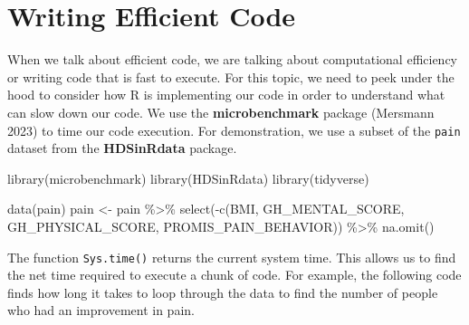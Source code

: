 \documentclass[
  letterpaper,
]{latex/krantz}
\makeatletter
\newenvironment{Shaded}{\begin{snugshade}}{\end{snugshade}}
\newcommand{\CommentTok}[1]{\textcolor[rgb]{0.37,0.37,0.37}{#1}}
\newcommand{\ControlFlowTok}[1]{\textcolor[rgb]{0.00,0.23,0.31}{#1}}
\newcommand{\DecValTok}[1]{\textcolor[rgb]{0.68,0.00,0.00}{#1}}
\newcommand{\FunctionTok}[1]{\textcolor[rgb]{0.28,0.35,0.67}{#1}}
\newcommand{\NormalTok}[1]{\textcolor[rgb]{0.00,0.23,0.31}{#1}}
\newcommand{\OtherTok}[1]{\textcolor[rgb]{0.00,0.23,0.31}{#1}}
\newcommand{\SpecialCharTok}[1]{\textcolor[rgb]{0.37,0.37,0.37}{#1}}
\newenvironment{kframe}{%
\medskip{}
\setlength{\fboxsep}{.8em}
 \def\at@end@of@kframe{}%
 \ifinner\ifhmode%
  \def\at@end@of@kframe{\end{minipage}}%
  \begin{minipage}{\columnwidth}%
 \fi\fi%
 \def\FrameCommand##1{\hskip\@totalleftmargin \hskip-\fboxsep
 \colorbox{shadecolor}{##1}\hskip-\fboxsep
     \hskip-\linewidth \hskip-\@totalleftmargin \hskip\columnwidth}%
 \MakeFramed {\advance\hsize-\width
   \@totalleftmargin\z@ \linewidth\hsize
   \@setminipage}}%
 {\par\unskip\endMakeFramed%
 \at@end@of@kframe}
\renewenvironment{Shaded}{\begin{kframe}}{\end{kframe}}
\makeatother
\begin{document}
\chapter{Writing Efficient Code}\label{sec-efficiency}

When we talk about efficient code, we are talking
about computational efficiency or writing code that is fast to execute.
For this topic, we need to peek under the hood to consider how R is
implementing our code in order to understand what can slow down our
code. We use the \textbf{microbenchmark} package (Mersmann 2023)
 to time our code
execution. For demonstration, we use a subset
of the \texttt{pain} dataset  from
the \textbf{HDSinRdata} package.

\begin{Shaded}
\begin{Highlighting}[]
\FunctionTok{library}\NormalTok{(microbenchmark)}
\FunctionTok{library}\NormalTok{(HDSinRdata)}
\FunctionTok{library}\NormalTok{(tidyverse)}

\FunctionTok{data}\NormalTok{(pain)}
\NormalTok{pain }\OtherTok{\textless{}{-}}\NormalTok{ pain }\SpecialCharTok{\%\textgreater{}\%} 
  \FunctionTok{select}\NormalTok{(}\SpecialCharTok{{-}}\FunctionTok{c}\NormalTok{(BMI, GH\_MENTAL\_SCORE, GH\_PHYSICAL\_SCORE, }
\NormalTok{                  PROMIS\_PAIN\_BEHAVIOR)) }\SpecialCharTok{\%\textgreater{}\%}
  \FunctionTok{na.omit}\NormalTok{()}
\end{Highlighting}
\end{Shaded}

The function
\texttt{Sys.time()}
returns the current system time. This allows us to find the net time
required to execute a chunk of code. For example, the following code
finds how long it takes to loop through the data to find the number of
people who had an improvement in pain.

\begin{Shaded}
\end{Shaded}
\end{document}
